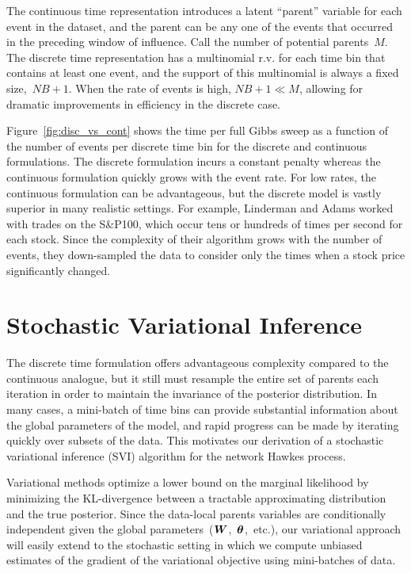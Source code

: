 The continuous time representation introduces a latent ``parent''
variable for each event in the dataset, and the parent can be any one
of the events that occurred in the preceding window of influence. Call
the number of potential parents~$M$. The discrete time representation
has a multinomial r.v. for each time bin that contains at least one
event, and the support of this multinomial is always a fixed
size,~${NB+1}$.  When the rate of events is high, $NB+1 \ll M$,
allowing for dramatic improvements in efficiency in the discrete case.

Figure~\ref{fig:disc_vs_cont} shows the time per full Gibbs sweep as a
function of the number of events per discrete time bin for the
discrete and continuous formulations. The discrete formulation incurs
a constant penalty whereas the continuous formulation quickly grows
with the event rate. For low rates, the continuous formulation can be
advantageous, but the discrete model is vastly superior in many
realistic settings. For example, Linderman and Adams worked with
trades on the S\&P100, which occur tens or hundreds of times per
second for each stock. Since the complexity of their algorithm grows
with the number of events, they down-sampled the data to consider only
the times when a stock price significantly changed.

\section{Stochastic Variational Inference}
The discrete time formulation offers advantageous complexity compared
to the continuous analogue, but it still must resample the entire set
of parents each iteration in order to maintain the invariance of the
posterior distribution. In many cases, a mini-batch of time bins can
provide substantial information about the global parameters of the
model, and rapid progress can be made by iterating quickly over
subsets of the data. This motivates our derivation of a stochastic
variational inference (SVI) algorithm for the network Hawkes process.

Variational methods optimize a lower bound on the marginal likelihood
by minimizing the KL-divergence between a tractable approximating
distribution and the true posterior. Since the data-local parents
variables are conditionally independent given the global
parameters~($\boldsymbol{W}$,~$\boldsymbol{\theta}$,~etc.), our variational approach will
easily extend to the stochastic setting in which we compute unbiased
estimates of the gradient of the variational objective using
mini-batches of data.

